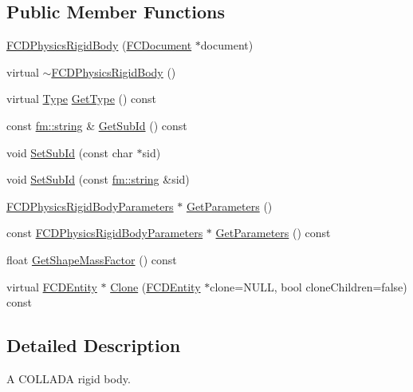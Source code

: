 \subsection*{Public Member Functions}
\begin{DoxyCompactItemize}
\item 
\hyperlink{classFCDPhysicsRigidBody_a0019e47e19790d3c31b3fb474103b267}{FCDPhysicsRigidBody} (\hyperlink{classFCDocument}{FCDocument} $\ast$document)
\item 
virtual \hyperlink{classFCDPhysicsRigidBody_a62c05825ef87903b9e24ef0f5bdabe3c}{$\sim$FCDPhysicsRigidBody} ()
\item 
virtual \hyperlink{classFCDEntity_a9301a4bd5f4d4190ec13e40db4effdd7}{Type} \hyperlink{classFCDPhysicsRigidBody_a5cfe206a60862fd34274e257d94628eb}{GetType} () const 
\item 
const \hyperlink{classfm_1_1stringT}{fm::string} \& \hyperlink{classFCDPhysicsRigidBody_acd1890efbc95b0834156913024302017}{GetSubId} () const 
\item 
void \hyperlink{classFCDPhysicsRigidBody_ac846aa8af914f061738945d57de8d5c1}{SetSubId} (const char $\ast$sid)
\item 
void \hyperlink{classFCDPhysicsRigidBody_a3d08dc5f77ddfe8ec5f0da816c18bfd8}{SetSubId} (const \hyperlink{classfm_1_1stringT}{fm::string} \&sid)
\item 
\hyperlink{classFCDPhysicsRigidBodyParameters}{FCDPhysicsRigidBodyParameters} $\ast$ \hyperlink{classFCDPhysicsRigidBody_a6286b1a609dad2e7381d77c41195b2aa}{GetParameters} ()
\item 
const \hyperlink{classFCDPhysicsRigidBodyParameters}{FCDPhysicsRigidBodyParameters} $\ast$ \hyperlink{classFCDPhysicsRigidBody_a00f353e11572fe0a371780c84ef8659e}{GetParameters} () const 
\item 
float \hyperlink{classFCDPhysicsRigidBody_af30dd37bccbaf8d9d35528b8e2f109f0}{GetShapeMassFactor} () const 
\item 
virtual \hyperlink{classFCDEntity}{FCDEntity} $\ast$ \hyperlink{classFCDPhysicsRigidBody_abbb8a9d5b02b252b2ae887edb2afe937}{Clone} (\hyperlink{classFCDEntity}{FCDEntity} $\ast$clone=NULL, bool cloneChildren=false) const 
\end{DoxyCompactItemize}


\subsection{Detailed Description}
A COLLADA rigid body.

